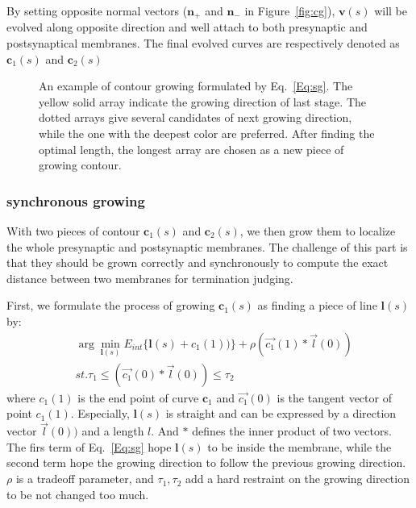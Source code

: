By setting opposite normal vectors ($\mathbf{n}_{+}$ and $\mathbf{n}_{-}$ in Figure~\ref{fig:cg}), $\mathbf{v}(s)$ will be evolved along opposite direction and well attach to both presynaptic and postsynaptical membranes.
The final evolved curves are respectively denoted as $\mathbf{c}_1(s)$ and $\mathbf{c}_2(s)$

\begin{figure}[t]
\begin{minipage}[b]{1.0\linewidth}
  \centering
 \centerline{}
\end{minipage}
\caption{An example of contour growing formulated by Eq.~\ref{Eq:sg}.
        The yellow solid array indicate the growing direction of last stage.
        The dotted arrays give several candidates of next growing direction, while the one with the deepest color are preferred.
        After finding the optimal length, the longest array are chosen as a new piece of growing contour.}
\label{fig:g}
\end{figure}

\subsubsection{synchronous growing}
With two pieces of contour $\mathbf{c}_1(s)$ and $\mathbf{c}_2(s)$, we then grow them to localize the whole presynaptic and postsynaptic membranes.
The challenge of this part is that they should be grown correctly and synchronously to compute the exact distance between two membranes for termination judging.

First, we formulate the process of growing $\mathbf{c}_1(s)$ as finding a piece of line $\mathbf{l}(s)$ by:
\begin{eqnarray}\label{Eq:sg}
&\arg\min_{\mathbf{l}(s)} E_{int}\{\mathbf{l}(s)+c_1(1))\}+\rho(\overrightarrow{c_1}(1)*\overrightarrow{l}(0))\\
&st. \tau_1\leq (\overrightarrow{c_1}(0)*\overrightarrow{l}(0))\leq \tau_2\nonumber
\end{eqnarray}
where $c_1(1)$ is the end point of curve $\mathbf{c}_1$ and $\overrightarrow{c_1}(0)$ is the tangent vector of point $c_1(1)$.
Especially, $\mathbf{l}(s)$ is straight and can be expressed by a direction vector $\overrightarrow{l}(0))$ and a length $l$.
And $*$ defines the inner product of two vectors.
The firs term of Eq.~\ref{Eq:sg} hope $\mathbf{l}(s)$ to be inside the membrane, while the second term hope the growing direction to follow the previous growing direction.
$\rho$ is a tradeoff parameter, and $\tau_1,\tau_2$ add a hard restraint on the growing direction to be not changed too much.

